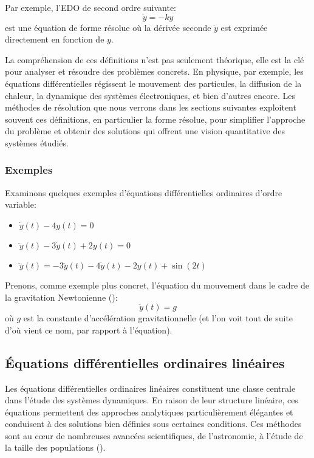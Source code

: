         Par exemple, l'EDO de second ordre suivante:
        \begin{equation}
            \ddot{y}=-k y
        \end{equation}
        est une équation de forme résolue où la dérivée seconde $\ddot{y}$ est exprimée directement en fonction de $y$. 
        
        La compréhension de ces définitions n'est pas seulement théorique, elle est la clé pour analyser et résoudre des problèmes concrets. En physique, par exemple, les équations différentielles régissent le mouvement des particules, la diffusion de la chaleur, la dynamique des systèmes électroniques, et bien d'autres encore. Les méthodes de résolution que nous verrons dans les sections suivantes exploitent souvent ces définitions, en particulier la forme résolue, pour simplifier l'approche du problème et obtenir des solutions qui offrent une vision quantitative des systèmes étudiés.
        
            \subsubsection{Exemples}
                Examinons quelques exemples d'équations différentielles ordinaires d'ordre variable:
                \begin{itemize}
                    \item $\dot{y}(t) - 4y(t)=0$
                    \item $\dddot{y}(t) - 3\dot{y}(t) + 2y(t)=0$
                    \item $\dddot{y}(t)=-3\ddot{y}(t) - 4\dot{y}(t) - 2y(t) + \sin(2t)$
                \end{itemize}
    
                Prenons, comme exemple plus concret, l'équation du mouvement dans le cadre de la gravitation Newtonienne (\cite{Newton1687}):
                \begin{equation}
                    \ddot{y}(t)=g
                \end{equation}
                où $g$ est la constante d'accélération gravitationnelle (et l'on voit tout de suite d'où vient ce nom, par rapport à l'équation).

        \subsection{Équations différentielles ordinaires linéaires}
            Les équations différentielles ordinaires linéaires constituent une classe centrale dans l'étude des systèmes dynamiques. En raison de leur structure linéaire, ces équations permettent des approches analytiques particulièrement élégantes et conduisent à des solutions bien définies sous certaines conditions. Ces méthodes sont au cœur de nombreuses avancées scientifiques, de l'astronomie, à l'étude de la taille des populations (\cite{Verhulst1838}).
            
